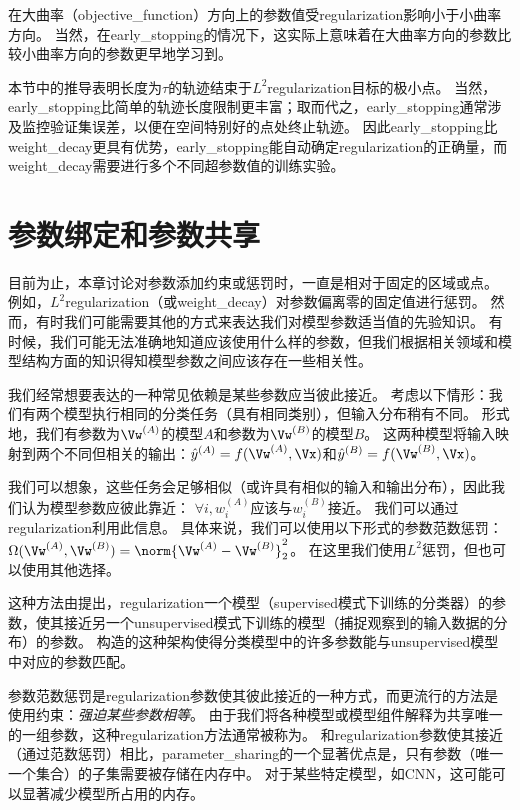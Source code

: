在大曲率（\gls{objective_function}）方向上的参数值受\gls{regularization}影响小于小曲率方向。
当然，在\gls{early_stopping}的情况下，这实际上意味着在大曲率方向的参数比较小曲率方向的参数更早地学习到。
 
本节中的推导表明长度为$\tau$的轨迹结束于$L^2$\gls{regularization}目标的极小点。
当然，\gls{early_stopping}比简单的轨迹长度限制更丰富；取而代之，\gls{early_stopping}通常涉及监控验证集误差，以便在空间特别好的点处终止轨迹。
因此\gls{early_stopping}比\gls{weight_decay}更具有优势，\gls{early_stopping}能自动确定\gls{regularization}的正确量，而\gls{weight_decay}需要进行多个不同超参数值的训练实验。


\section{参数绑定和参数共享}
\label{sec:parameter_tying_and_parameter_sharing}
目前为止，本章讨论对参数添加约束或惩罚时，一直是相对于固定的区域或点。
例如，$L^2$\gls{regularization}（或\gls{weight_decay}）对参数偏离零的固定值进行惩罚。
然而，有时我们可能需要其他的方式来表达我们对模型参数适当值的先验知识。
有时候，我们可能无法准确地知道应该使用什么样的参数，但我们根据相关领域和模型结构方面的知识得知模型参数之间应该存在一些相关性。

我们经常想要表达的一种常见依赖是某些参数应当彼此接近。
考虑以下情形：我们有两个模型执行相同的分类任务（具有相同类别），但输入分布稍有不同。
形式地，我们有参数为$\Vw^{(A)}$的模型$A$和参数为$\Vw^{(B)}$的模型$B$。
这两种模型将输入映射到两个不同但相关的输出：$\hat y^{(A)} = f(\Vw^{(A)}, \Vx)$和$\hat y^{(B)} = f(\Vw^{(B)}, \Vx)$。

我们可以想象，这些任务会足够相似（或许具有相似的输入和输出分布），因此我们认为模型参数应彼此靠近：
$\forall i, w_i^{(A)}$应该与$ w_i^{(B)}$接近。
我们可以通过\gls{regularization}利用此信息。
具体来说，我们可以使用以下形式的参数范数惩罚：
$\Omega(\Vw^{(A)}, \Vw^{(B)}) = \norm{\Vw^{(A)}-\Vw^{(B)}}_2^2$。
在这里我们使用$L^2$惩罚，但也可以使用其他选择。

这种方法由\cite{LasserreJ2006}提出，\gls{regularization}一个模型（\gls{supervised}模式下训练的分类器）的参数，使其接近另一个\gls{unsupervised}模式下训练的模型（捕捉观察到的输入数据的分布）的参数。
构造的这种架构使得分类模型中的许多参数能与\gls{unsupervised}模型中对应的参数匹配。

参数范数惩罚是\gls{regularization}参数使其彼此接近的一种方式，而更流行的方法是使用约束：\emph{强迫某些参数相等}。
由于我们将各种模型或模型组件解释为共享唯一的一组参数，这种\gls{regularization}方法通常被称为。
和\gls{regularization}参数使其接近（通过范数惩罚）相比，\gls{parameter_sharing}的一个显著优点是，只有参数（唯一一个集合）的子集需要被存储在内存中。
对于某些特定模型，如\gls{CNN}，这可能可以显著减少模型所占用的内存。



